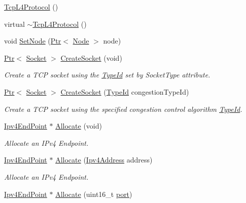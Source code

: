 \begin{DoxyCompactItemize}
\item 
\hyperlink{classns3_1_1TcpL4Protocol_a56aa36e10a43fbdc7b0765562498fa10}{Tcp\+L4\+Protocol} ()
\item 
virtual \hyperlink{classns3_1_1TcpL4Protocol_af9b9b6731ad1df044ef4416ff88bdc85}{$\sim$\+Tcp\+L4\+Protocol} ()
\item 
void \hyperlink{classns3_1_1TcpL4Protocol_a092de53315ed89dfa2080ef0d92ccd56}{Set\+Node} (\hyperlink{classns3_1_1Ptr}{Ptr}$<$ \hyperlink{classns3_1_1Node}{Node} $>$ node)
\item 
\hyperlink{classns3_1_1Ptr}{Ptr}$<$ \hyperlink{classns3_1_1Socket}{Socket} $>$ \hyperlink{classns3_1_1TcpL4Protocol_a896ad7a5e3959180dce59e81897f131c}{Create\+Socket} (void)
\begin{DoxyCompactList}\small\item\em Create a T\+CP socket using the \hyperlink{classns3_1_1TypeId}{Type\+Id} set by Socket\+Type attribute. \end{DoxyCompactList}\item 
\hyperlink{classns3_1_1Ptr}{Ptr}$<$ \hyperlink{classns3_1_1Socket}{Socket} $>$ \hyperlink{classns3_1_1TcpL4Protocol_ae5d3e3fd9fa44cc80d3ae5f62e4dfb82}{Create\+Socket} (\hyperlink{classns3_1_1TypeId}{Type\+Id} congestion\+Type\+Id)
\begin{DoxyCompactList}\small\item\em Create a T\+CP socket using the specified congestion control algorithm \hyperlink{classns3_1_1TypeId}{Type\+Id}. \end{DoxyCompactList}\item 
\hyperlink{classns3_1_1Ipv4EndPoint}{Ipv4\+End\+Point} $\ast$ \hyperlink{classns3_1_1TcpL4Protocol_a9e0180270b7b8106263b1b3660e71094}{Allocate} (void)
\begin{DoxyCompactList}\small\item\em Allocate an I\+Pv4 Endpoint. \end{DoxyCompactList}\item 
\hyperlink{classns3_1_1Ipv4EndPoint}{Ipv4\+End\+Point} $\ast$ \hyperlink{classns3_1_1TcpL4Protocol_ad3e4b59d30097e97f69a1d2dcf1455ab}{Allocate} (\hyperlink{classns3_1_1Ipv4Address}{Ipv4\+Address} address)
\begin{DoxyCompactList}\small\item\em Allocate an I\+Pv4 Endpoint. \end{DoxyCompactList}\item 
\hyperlink{classns3_1_1Ipv4EndPoint}{Ipv4\+End\+Point} $\ast$ \hyperlink{classns3_1_1TcpL4Protocol_a6ab346a592abf0bcbd008822aa06a395}{Allocate} (uint16\+\_\+t \hyperlink{visualizer-ideas_8txt_a21ff1c530daf8435e00048b7fc2c58e3}{port})

\end{DoxyCompactItemize}
